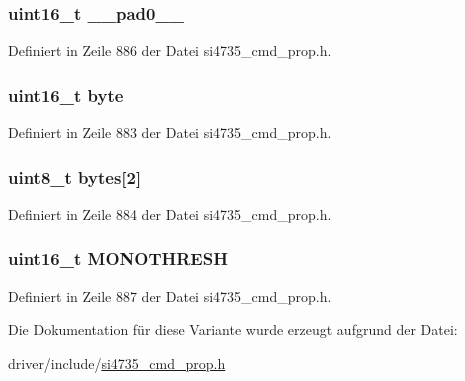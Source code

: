 \subsubsection[{\+\_\+\+\_\+pad0\+\_\+\+\_\+}]{\setlength{\rightskip}{0pt plus 5cm}uint16\+\_\+t \+\_\+\+\_\+pad0\+\_\+\+\_\+}\label{unionfm__blend__snr__mono__thres_a77132c2c26a75f5b8751b235cda23828}


Definiert in Zeile 886 der Datei si4735\+\_\+cmd\+\_\+prop.\+h.

\hypertarget{unionfm__blend__snr__mono__thres_ab0549c1b5ea980a02e7eab77e21fea49}{}
\subsubsection[{byte}]{\setlength{\rightskip}{0pt plus 5cm}uint16\+\_\+t byte}\label{unionfm__blend__snr__mono__thres_ab0549c1b5ea980a02e7eab77e21fea49}


Definiert in Zeile 883 der Datei si4735\+\_\+cmd\+\_\+prop.\+h.

\hypertarget{unionfm__blend__snr__mono__thres_a46e4c05d20a047ec169f60d3167e912e}{}
\subsubsection[{bytes}]{\setlength{\rightskip}{0pt plus 5cm}uint8\+\_\+t bytes\mbox{[}2\mbox{]}}\label{unionfm__blend__snr__mono__thres_a46e4c05d20a047ec169f60d3167e912e}


Definiert in Zeile 884 der Datei si4735\+\_\+cmd\+\_\+prop.\+h.

\hypertarget{unionfm__blend__snr__mono__thres_a5de7498b6512934529d0c6284f120805}{}
\subsubsection[{M\+O\+N\+O\+T\+H\+R\+E\+S\+H}]{\setlength{\rightskip}{0pt plus 5cm}uint16\+\_\+t M\+O\+N\+O\+T\+H\+R\+E\+S\+H}\label{unionfm__blend__snr__mono__thres_a5de7498b6512934529d0c6284f120805}


Definiert in Zeile 887 der Datei si4735\+\_\+cmd\+\_\+prop.\+h.



Die Dokumentation für diese Variante wurde erzeugt aufgrund der Datei\+:\begin{DoxyCompactItemize}
\item 
driver/include/\hyperlink{si4735__cmd__prop_8h}{si4735\+\_\+cmd\+\_\+prop.\+h}\end{DoxyCompactItemize}
